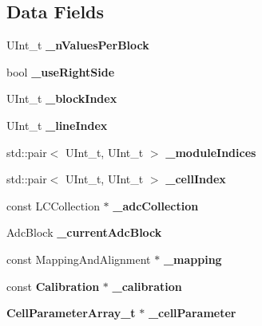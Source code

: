 \subsection*{Data Fields}
\begin{DoxyCompactItemize}
\item 
U\-Int\-\_\-t {\bfseries \-\_\-n\-Values\-Per\-Block}\label{classCALICE_1_1AdcValueAccess_a8f6e0844c088e95c3d473f2aa3633778}

\item 
bool {\bfseries \-\_\-use\-Right\-Side}\label{classCALICE_1_1AdcValueAccess_aa17c51c82cee702c234740a9037b8a62}

\item 
U\-Int\-\_\-t {\bfseries \-\_\-block\-Index}\label{classCALICE_1_1AdcValueAccess_a7cbe774ac91cc4fb9d4e62a5d78ab3ea}

\item 
U\-Int\-\_\-t {\bfseries \-\_\-line\-Index}\label{classCALICE_1_1AdcValueAccess_a5aa2c0e0e9c674df6ddc9dd038e67336}

\item 
std\-::pair$<$ U\-Int\-\_\-t, U\-Int\-\_\-t $>$ {\bfseries \-\_\-module\-Indices}\label{classCALICE_1_1AdcValueAccess_af373eb64168bf34b92cf85b7f6aba3ce}

\item 
std\-::pair$<$ U\-Int\-\_\-t, U\-Int\-\_\-t $>$ {\bfseries \-\_\-cell\-Index}\label{classCALICE_1_1AdcValueAccess_a2324c0e1891d1fa418e1e1b8bb16dc6e}

\item 
const L\-C\-Collection $\ast$ {\bfseries \-\_\-adc\-Collection}\label{classCALICE_1_1AdcValueAccess_acd2fb49d0afa34c7a158baa2b64eacf8}

\item 
Adc\-Block {\bfseries \-\_\-current\-Adc\-Block}\label{classCALICE_1_1AdcValueAccess_a0cd454fbfe0e49b54ee7fa7fb2640c4e}

\item 
const Mapping\-And\-Alignment $\ast$ {\bfseries \-\_\-mapping}\label{classCALICE_1_1AdcValueAccess_a419e13811c64297fa7551e81ab6546fb}

\item 
const {\bf Calibration} $\ast$ {\bfseries \-\_\-calibration}\label{classCALICE_1_1AdcValueAccess_aec81ecb16efeb7528211d61389a92308}

\item 
{\bf Cell\-Parameter\-Array\-\_\-t} $\ast$ {\bfseries \-\_\-cell\-Parameter}\label{classCALICE_1_1AdcValueAccess_af589887575dfd47fc70f4db5dcd74c3a}

\end{DoxyCompactItemize}


